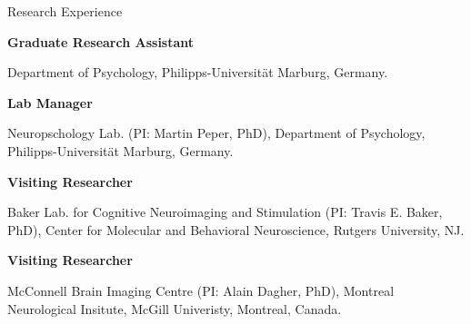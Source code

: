 \begin{rubric}{Research Experience}


\textbf{Graduate Research Assistant} 
\par Department of Psychology, Philipps-Universit\"at Marburg, Germany. 
\vspace{5pt}
\par \textbf{Lab Manager} 
\par Neuropschology Lab. (PI: Martin Peper, PhD), Department of Psychology, Philipps-Universit\"at Marburg, Germany.

\entry*[Oct 2018] 
\textbf{Visiting Researcher} \par Baker Lab. for Cognitive Neuroimaging and Stimulation (PI: Travis E. Baker, PhD), Center for Molecular and Behavioral Neuroscience, Rutgers University, NJ.

\textbf{Visiting Researcher} \par McConnell Brain Imaging Centre (PI: Alain Dagher, PhD), Montreal Neurological Insitute, McGill Univeristy, Montreal, Canada.

\end{rubric}
